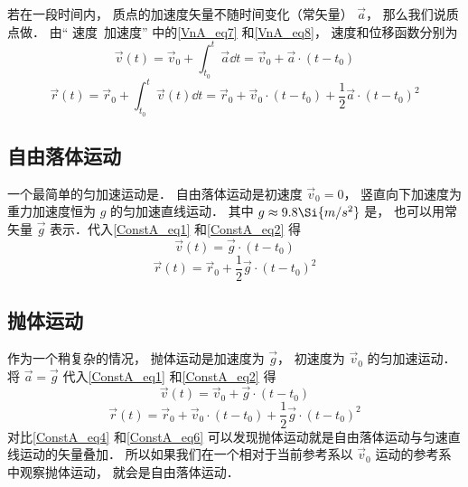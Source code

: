 

若在一段时间内， 质点的加速度矢量不随时间变化（常矢量） $\vec a$， 那么我们说质点做． 由“ 速度\ 加速度” 中的\autoref{VnA_eq7} 和\autoref{VnA_eq8}， 速度和位移函数分别为
\begin{equation}\label{ConstA_eq1}
\vec v(t) = \vec v_0 + \int_{t_0}^{t} \vec a \dd{t} = \vec v_0 + \vec a \cdot (t-t_0)
\end{equation}
\begin{equation}\label{ConstA_eq2}
\vec r(t) = \vec r_0 + \int_{t_0}^{t} \vec v(t) \dd{t} = \vec r_0 + \vec v_0\cdot (t-t_0) + \frac 12 \vec a\cdot (t-t_0)^2
\end{equation}




\subsection{自由落体运动}
一个最简单的匀加速运动是． 自由落体运动是初速度 $\vec v_0 = 0$， 竖直向下加速度为重力加速度恒为 $g$ 的匀加速直线运动． 其中 $g\approx 9.8\Si{m/s^2}$ 是， 也可以用常矢量 $\vec g$ 表示．代入\autoref{ConstA_eq1} 和\autoref{ConstA_eq2} 得
\begin{equation}\label{ConstA_eq3}
\vec v(t) = \vec g \cdot (t-t_0)
\end{equation}
\begin{equation}\label{ConstA_eq4}
\vec r(t) = \vec r_0 + \frac 12 \vec g \cdot (t-t_0)^2
\end{equation}

\subsection{抛体运动}
作为一个稍复杂的情况， 抛体运动是加速度为 $\vec g$， 初速度为 $\vec v_0$ 的匀加速运动． 将 $\vec a = \vec g$ 代入\autoref{ConstA_eq1} 和\autoref{ConstA_eq2} 得
\begin{equation}\label{ConstA_eq5}
\vec v(t) = \vec v_0 + \vec g \cdot (t-t_0)
\end{equation}
\begin{equation}\label{ConstA_eq6}
\vec r(t) = \vec r_0 + \vec v_0\cdot (t-t_0) + \frac 12 \vec g\cdot (t-t_0)^2
\end{equation}
对比\autoref{ConstA_eq4} 和\autoref{ConstA_eq6} 可以发现抛体运动就是自由落体运动与匀速直线运动的矢量叠加． 所以如果我们在一个相对于当前参考系以 $\vec v_0$ 运动的参考系中观察抛体运动， 就会是自由落体运动．

